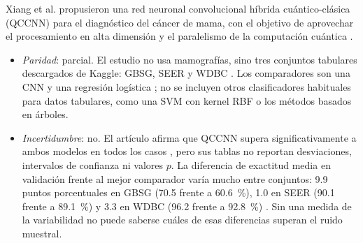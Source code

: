 Xiang et al. propusieron una red neuronal convolucional híbrida cuántico-clásica (QCCNN) para el diagnóstico del cáncer de mama, con el objetivo de aprovechar el procesamiento en alta dimensión y el paralelismo de la computación cuántica \cite{Xiang2024QuantumCNN}.
\begin{itemize}
  \item \textit{Paridad}: parcial.
  El estudio no usa mamografías, sino tres conjuntos tabulares descargados de Kaggle: GBSG, SEER y WDBC \cite{Xiang2024QuantumCNN}.
  Los comparadores son una CNN y una regresión logística \cite{Xiang2024QuantumCNN}; no se incluyen otros clasificadores habituales para datos tabulares, como una SVM con kernel RBF o los métodos basados en árboles.
  \item \textit{Incertidumbre}: no.
  El artículo afirma que QCCNN supera significativamente a ambos modelos en todos los casos \cite{Xiang2024QuantumCNN}, pero sus tablas no reportan desviaciones, intervalos de confianza ni valores $p$.
  La diferencia de exactitud media en validación frente al mejor comparador varía mucho entre conjuntos: 9.9 puntos porcentuales en GBSG (70.5 frente a 60.6~\%), 1.0 en SEER (90.1 frente a 89.1~\%) y 3.3 en WDBC (96.2 frente a 92.8~\%) \cite{Xiang2024QuantumCNN}. Sin una medida de la variabilidad no puede saberse cuáles de esas diferencias superan el ruido muestral.

\end{itemize}
